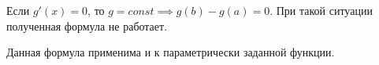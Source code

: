 \begin{remark}
  Если \(g'(x) = 0\), то \(g = const \implies g(b) - g(a) = 0\). При такой
  ситуации полученная формула не работает.
\end{remark}

\begin{remark}
  Данная формула применима и к параметрически заданной функции.
\end{remark}
